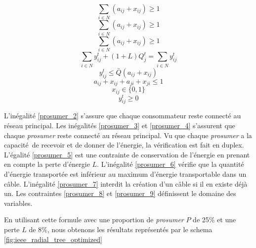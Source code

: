 \begin{equation} \label{prosumer_2}
  \sum_{i \in N} (a_{ij} + x_{ij}) \ge 1
\end{equation}
\begin{equation} \label{prosumer_3}
  \sum_{i \in N} (a_{ij} + x_{ij}) \ge 1
\end{equation}
\begin{equation} \label{prosumer_4}
  \sum_{i \in N} (a_{ij} + x_{ij}) \ge 1
\end{equation}
\begin{equation} \label{prosumer_5}
  \sum_{i \in N} y^t_{ij} + (1 + L) Q^t_j = \sum_{i \in N} y^t_{ij}
\end{equation}
\begin{equation} \label{prosumer_6}
  y^t_{ij} \le \bar{Q}(a_{ij} + x_{ij})
\end{equation}
\begin{equation} \label{prosumer_7}
  a_{ij} + x_{ij} + a_{ji} + x_{ji} \le 1
\end{equation}
\begin{equation} \label{prosumer_8}
  x_{ij} \in \lbrace 0, 1 \rbrace
\end{equation}
\begin{equation} \label{prosumer_9}
  y^t_{ij} \ge 0
\end{equation}


L'inégalité \ref{prosumer_2} s'assure que chaque consommateur reste connecté au réseau principal.
Les inégalités \ref{prosumer_3} et \ref{prosumer_4} s'assurent que chaque \textit{prosumer} reste connecté au réseau principal.
Vu que chaque \textit{prosumer} a la capacité de recevoir et de donner de l'énergie, la vérification
est fait en duplex.
L'égalité \ref{prosumer_5} est une contrainte de conservation de l'énergie en prenant en compte la perte d'énergie $L$.
L'inégalité \ref{prosumer_6} vérifie que la quantité d'énergie transportée est inférieur au maximum d'énergie transportable dans un câble.
L'inégalité \ref{prosumer_7} interdit la création d'un câble si il en existe déjà un.
Les contraintes \ref{prosumer_8} et \ref{prosumer_9} définissent le domaine des variables.

En utilisant cette formule avec une proportion de \textit{prosumer} $P$ de 25\% et une perte $L$ de 8\%,
nous obtenons les résultats représentés par le schema \ref{fig:ieee_radial_tree_optimized}

